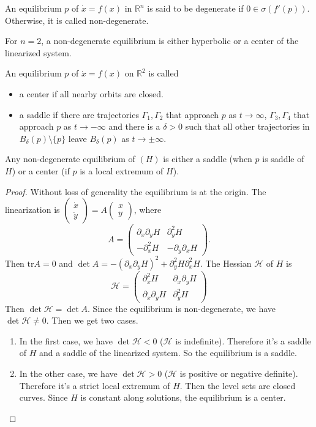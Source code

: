 \documentclass{article}
\newcommand*{\R}{\mathbb{R}}
\newcommand*{\Rn}{{\mathbb{R}^n}}
\newcommand*{\tr}{\text{tr}}
\newcommand{\vectwo}[2]{\begin{pmatrix} #1\\#2\end{pmatrix}}
\newcommand*{\mattwo}[4]{\begin{pmatrix}
    #1&#2\\#3&#4
\end{pmatrix}}
\begin{document}
\begin{defin}
    An equilibrium $p$ of $\dot x = f(x)$ in $\Rn$ is said to be degenerate if $0 \in \sigma(f'(p))$. Otherwise, it is called non-degenerate.
\end{defin}

\begin{rem}
    For $n = 2$, a non-degenerate equilibrium is either hyperbolic or a center of the linearized system.
\end{rem}

\begin{defin}
    An equilibrium $p$ of $\dot x = f(x)$ on $\R^2$ is called
    \begin{itemize}
        \item a center if all nearby orbits are closed.

        \item a saddle if there are trajectories $\Gamma_1, \Gamma_2$ that approach $p$ as $t\to\infty$, $\Gamma_3, \Gamma_4$ that approach $p$ as $t\to-\infty$ and there is a $\delta>0$ such that all other trajectories in $B_\delta(p)\setminus\{p\}$ leave $B_\delta(p)$ as $t \to \pm\infty$.
    \end{itemize}
\end{defin}

\begin{thm}
    Any non-degenerate equilibrium of $(H)$ is either a saddle (when $p$ is saddle of $H$) or a center (if $p$ is a local extremum of $H$).
\end{thm}

\begin{proof}
    Without loss of generality the equilibrium is at the origin. The linearization is $\vectwo{\dot x}{\dot y}=A\vectwo xy$, where
    $$A = \mattwo{\partial_x\partial_y H}{\partial_y^2H}{-\partial_x^2H}{-\partial_y\partial_x H}.$$
    Then $\tr A = 0$ and $\det A= -(\partial_x\partial_yH)^2+\partial_y^2 H\partial_x^2 H$. The Hessian $\mathcal H$ of $H$ is
    $$\mathcal H = \mattwo{\partial_x^2H}{\partial_x\partial_y H}{\partial_x\partial_yH}{\partial_y^2H}$$
    Then $\det \mathcal H = \det A$. Since the equilibrium is non-degenerate, we have $\det\mathcal H \neq 0$. Then we get two cases.
    \begin{enumerate}
        \item In the first case, we have $\det \mathcal H < 0$ ($\mathcal H$ is indefinite). Therefore it's a saddle of $H$ and a saddle of the linearized system. So the equilibrium is a saddle.

        \item In the other case, we have $\det \mathcal H > 0$ ($\mathcal H$ is positive or negative definite). Therefore it's a strict local extremum of $H$. Then the level sets are closed curves. Since $H$ is constant along solutions, the equilibrium is a center.
    \end{enumerate}

\end{proof}
\end{document}
